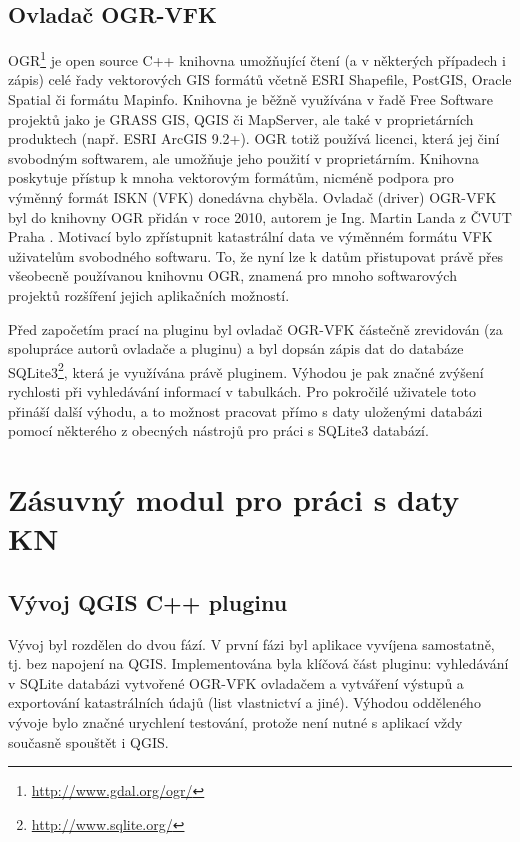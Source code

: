 \documentclass[a4paper,10pt]{article}
\begin{document}
\subsection{Ovladač OGR-VFK}
OGR\footnote{\url{http://www.gdal.org/ogr/}} je open source C++ knihovna umožňující čtení (a v některých případech i zápis)
celé řady vektorových GIS formátů včetně ESRI Shapefile, PostGIS, Oracle Spatial či formátu Mapinfo.
Knihovna je běžně využívána v řadě Free Software projektů jako je GRASS GIS, QGIS či MapServer, ale také v proprietárních produktech (např. ESRI ArcGIS 9.2+).
OGR totiž používá licenci, která jej činí svobodným softwarem, ale umožňuje jeho použití v proprietárním.
Knihovna poskytuje přístup k mnoha vektorovým formátům, nicméně podpora pro výměnný formát ISKN (VFK) donedávna chyběla.
Ovladač (driver) OGR-VFK byl do knihovny OGR přidán v roce 2010, autorem je Ing. Martin Landa z ČVUT Praha \cite{vfkDriver}.
Motivací bylo zpřístupnit katastrální data ve výměnném formátu VFK uživatelům svobodného softwaru.
To, že nyní lze k datům přistupovat právě přes všeobecně používanou knihovnu OGR, znamená pro mnoho softwarových projektů rozšíření jejich aplikačních možností.

Před započetím prací na pluginu byl ovladač OGR-VFK částečně zrevidován (za spolupráce autorů ovladače a pluginu)
a byl dopsán zápis dat do databáze SQLite3\footnote{\url{http://www.sqlite.org/}}, která je využívána právě pluginem.
Výhodou je pak značné zvýšení rychlosti při vyhledávání informací v tabulkách.
Pro pokročilé uživatele toto přináší další výhodu, a to možnost pracovat přímo s daty uloženými databázi pomocí některého z obecných nástrojů pro práci s SQLite3 databází.


\section{Zásuvný modul pro práci s daty KN}

\subsection{Vývoj QGIS C++ pluginu}
Vývoj byl rozdělen do dvou fází.
V první fázi byl aplikace vyvíjena samostatně, tj. bez napojení na QGIS.
Implementována byla klíčová část pluginu: vyhledávání v SQLite databázi vytvořené OGR-VFK ovladačem a vytváření výstupů a exportování katastrálních údajů (list vlastnictví a jiné).
Výhodou odděleného vývoje bylo značné urychlení testování, protože není nutné s aplikací vždy současně spouštět i QGIS.
\end{document}
